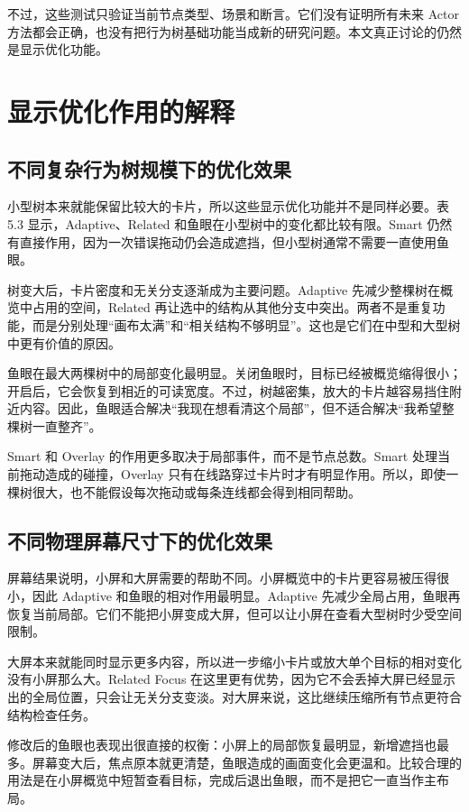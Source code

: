 \documentclass[11pt,a4paper,oneside,extrafontsizes]{memoir}
\begin{document}
不过，这些测试只验证当前节点类型、场景和断言。它们没有证明所有未来 Actor 方法都会正确，也没有把行为树基础功能当成新的研究问题。本文真正讨论的仍然是显示优化功能。

\section{显示优化作用的解释}

\subsection{不同复杂行为树规模下的优化效果}

小型树本来就能保留比较大的卡片，所以这些显示优化功能并不是同样必要。表 5.3 显示，Adaptive、Related 和鱼眼在小型树中的变化都比较有限。Smart 仍然有直接作用，因为一次错误拖动仍会造成遮挡，但小型树通常不需要一直使用鱼眼。

树变大后，卡片密度和无关分支逐渐成为主要问题。Adaptive 先减少整棵树在概览中占用的空间，Related 再让选中的结构从其他分支中突出。两者不是重复功能，而是分别处理“画布太满”和“相关结构不够明显”。这也是它们在中型和大型树中更有价值的原因。

鱼眼在最大两棵树中的局部变化最明显。关闭鱼眼时，目标已经被概览缩得很小；开启后，它会恢复到相近的可读宽度。不过，树越密集，放大的卡片越容易挡住附近内容。因此，鱼眼适合解决“我现在想看清这个局部”，但不适合解决“我希望整棵树一直整齐”。

Smart 和 Overlay 的作用更多取决于局部事件，而不是节点总数。Smart 处理当前拖动造成的碰撞，Overlay 只有在线路穿过卡片时才有明显作用。所以，即使一棵树很大，也不能假设每次拖动或每条连线都会得到相同帮助。

\subsection{不同物理屏幕尺寸下的优化效果}

屏幕结果说明，小屏和大屏需要的帮助不同。小屏概览中的卡片更容易被压得很小，因此 Adaptive 和鱼眼的相对作用最明显。Adaptive 先减少全局占用，鱼眼再恢复当前局部。它们不能把小屏变成大屏，但可以让小屏在查看大型树时少受空间限制。

大屏本来就能同时显示更多内容，所以进一步缩小卡片或放大单个目标的相对变化没有小屏那么大。Related Focus 在这里更有优势，因为它不会丢掉大屏已经显示出的全局位置，只会让无关分支变淡。对大屏来说，这比继续压缩所有节点更符合结构检查任务。

修改后的鱼眼也表现出很直接的权衡：小屏上的局部恢复最明显，新增遮挡也最多。屏幕变大后，焦点原本就更清楚，鱼眼造成的画面变化会更温和。比较合理的用法是在小屏概览中短暂查看目标，完成后退出鱼眼，而不是把它一直当作主布局。
\end{document}

